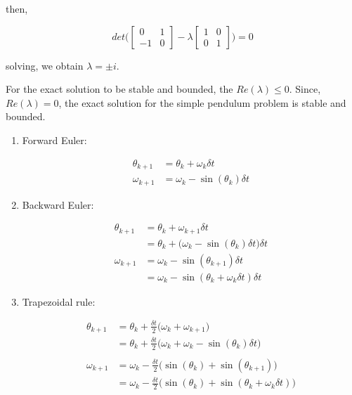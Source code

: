\documentclass[a4paper,11pt]{report}
\begin{document}
\begin{enumerate}
    then,

    \begin{equation*}
    det \Bigg( \begin{bmatrix} 0 & 1 \\ -1 & 0 \end{bmatrix} - \lambda \begin{bmatrix} 1 & 0 \\ 0 & 1 \end{bmatrix} \Bigg) = 0
    \end{equation*}

    solving, we obtain $\lambda = \pm i$.

    For the exact solution to be stable and bounded, the $Re(\lambda) \le 0$. 
    Since, $Re(\lambda) = 0$, the exact solution for the simple pendulum problem
    is stable and bounded.


    \begin{enumerate}

    \item Forward Euler:
    
    \begin{equation*}
    \begin{aligned}
    \theta_{k+1} &= \theta_{k} + \omega_{k} \delta t \\
    \omega_{k+1} &= \omega_{k} - \sin(\theta_{k}) \delta t
    \end{aligned}
    \end{equation*}

    \item Backward Euler:

    \begin{equation*}
    \begin{aligned}
    \theta_{k+1} &= \theta_{k} + \omega_{k+1} \delta t \\
                 &= \theta_{k} + \Big( \omega_{k} - \sin(\theta_{k}) \delta t \Big) \delta t \\
    \omega_{k+1} &= \omega_{k} - \sin(\theta_{k+1}) \delta t \\
                 &= \omega_{k} - \sin(\theta_{k} + \omega_{k} \delta t) \delta t
    \end{aligned}
    \end{equation*}

    \item Trapezoidal rule:

    \begin{equation*}
    \begin{aligned}
    \theta_{k+1} &= \theta_{k} + \frac{\delta t}{2} \Big( \omega_{k} + \omega_{k+1} \Big) \\
                 &= \theta_{k} + \frac{\delta t}{2} \Big( \omega_{k} + \omega_{k} - \sin(\theta_{k}) \delta t \Big) \\ \\
    \omega_{k+1} &= \omega_{k} - \frac{\delta t}{2} \Big( \sin(\theta_{k}) + \sin(\theta_{k+1}) \Big) \\
                 &= \omega_{k} - \frac{\delta t}{2} \Big( \sin(\theta_{k}) + \sin(\theta_{k} + \omega_{k} \delta t) \Big)
    \end{aligned}
    \end{equation*}


\end{enumerate}
\end{enumerate}
\end{document}
